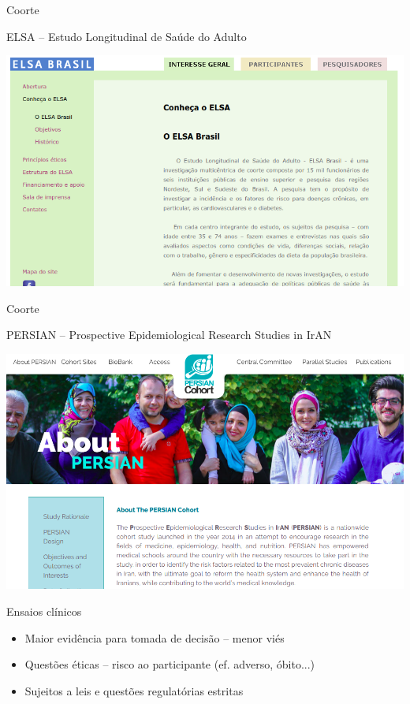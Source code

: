 \documentclass{beamer}
\begin{document}
\begin{frame}{Coorte}
  \begin{exampleblock}{{\footnotesize ELSA -- Estudo Longitudinal de Saúde do Adulto}}
    \begin{center}
      \includegraphics[width=.9\textwidth]{Metodos/coorte-ELSA}
    \end{center}
  \end{exampleblock}
\end{frame}

\begin{frame}{Coorte}
  \begin{exampleblock}{{\footnotesize PERSIAN -- Prospective Epidemiological Research Studies in IrAN}}
    \begin{center}
      \includegraphics[width=.9\textwidth]{Metodos/coorte-PERSIAN}
    \end{center}
  \end{exampleblock}
\end{frame}

\begin{frame}{Ensaios clínicos}
  \begin{itemize}
    \small
  \item Maior evidência para tomada de decisão -- menor viés
    \bigskip
  \item Questões éticas -- risco ao participante (ef. adverso, óbito...)
    \bigskip
  \item Sujeitos a leis e questões regulatórias estritas
    \bigskip
  \end{itemize}
\end{frame}
\end{document}
